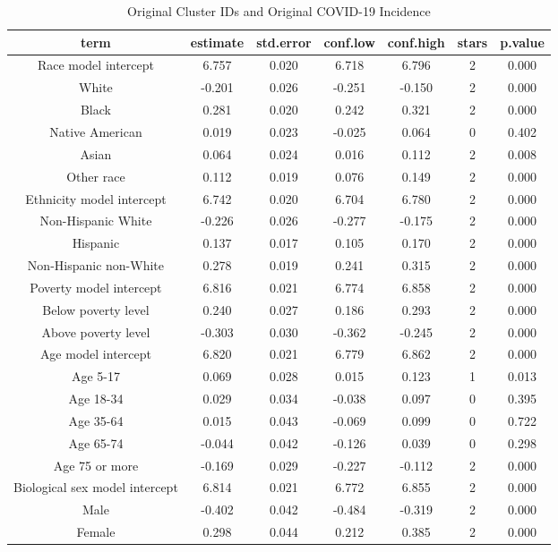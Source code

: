 \documentclass[
]{article}
\begin{document}
\begin{table}

\caption{\label{tab:gee-original-clusters-original-incidence}Original Cluster IDs and Original COVID-19 Incidence}
\centering
\begin{tabular}[t]{c|c|c|c|c|c|c}
\hline
term & estimate & std.error & conf.low & conf.high & stars & p.value\\
\hline
Race model intercept & 6.757 & 0.020 & 6.718 & 6.796 & 2 & 0.000\\
\hline
White & -0.201 & 0.026 & -0.251 & -0.150 & 2 & 0.000\\
\hline
Black & 0.281 & 0.020 & 0.242 & 0.321 & 2 & 0.000\\
\hline
Native American & 0.019 & 0.023 & -0.025 & 0.064 & 0 & 0.402\\
\hline
Asian & 0.064 & 0.024 & 0.016 & 0.112 & 2 & 0.008\\
\hline
Other race & 0.112 & 0.019 & 0.076 & 0.149 & 2 & 0.000\\
\hline
Ethnicity model intercept & 6.742 & 0.020 & 6.704 & 6.780 & 2 & 0.000\\
\hline
Non-Hispanic White & -0.226 & 0.026 & -0.277 & -0.175 & 2 & 0.000\\
\hline
Hispanic & 0.137 & 0.017 & 0.105 & 0.170 & 2 & 0.000\\
\hline
Non-Hispanic non-White & 0.278 & 0.019 & 0.241 & 0.315 & 2 & 0.000\\
\hline
Poverty model intercept & 6.816 & 0.021 & 6.774 & 6.858 & 2 & 0.000\\
\hline
Below poverty level & 0.240 & 0.027 & 0.186 & 0.293 & 2 & 0.000\\
\hline
Above poverty level & -0.303 & 0.030 & -0.362 & -0.245 & 2 & 0.000\\
\hline
Age model intercept & 6.820 & 0.021 & 6.779 & 6.862 & 2 & 0.000\\
\hline
Age 5-17 & 0.069 & 0.028 & 0.015 & 0.123 & 1 & 0.013\\
\hline
Age 18-34 & 0.029 & 0.034 & -0.038 & 0.097 & 0 & 0.395\\
\hline
Age 35-64 & 0.015 & 0.043 & -0.069 & 0.099 & 0 & 0.722\\
\hline
Age 65-74 & -0.044 & 0.042 & -0.126 & 0.039 & 0 & 0.298\\
\hline
Age 75 or more & -0.169 & 0.029 & -0.227 & -0.112 & 2 & 0.000\\
\hline
Biological sex model intercept & 6.814 & 0.021 & 6.772 & 6.855 & 2 & 0.000\\
\hline
Male & -0.402 & 0.042 & -0.484 & -0.319 & 2 & 0.000\\
\hline
Female & 0.298 & 0.044 & 0.212 & 0.385 & 2 & 0.000\\
\hline
\end{tabular}
\end{table}
\end{document}
